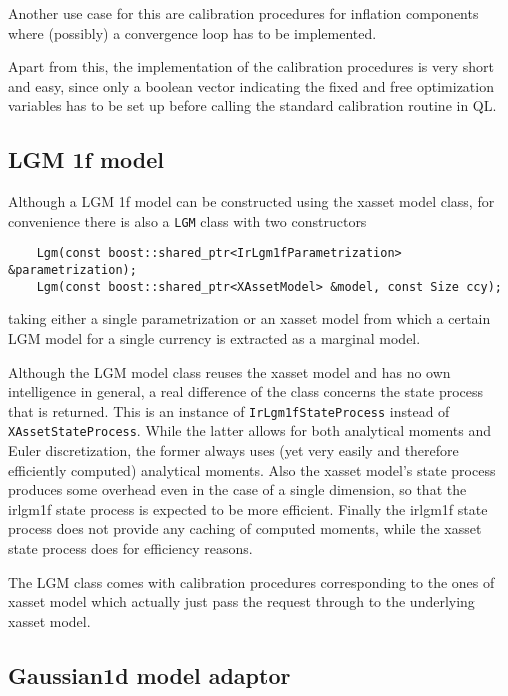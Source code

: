 \documentclass[12pt, a4paper]{article}
\begin{document}
Another use case for this are calibration procedures for inflation components where (possibly) a convergence loop has to be implemented.

Apart from this, the implementation of the calibration procedures is very short and easy, since only a boolean vector indicating the fixed and free optimization variables has to be set up before calling the standard calibration routine in QL.

\subsection{LGM 1f model}

Although a LGM 1f model can be constructed using the xasset model class, for convenience there is also a \verb+LGM+ class with two constructors

\medskip
\scriptsize
\begin{verbatim}
    Lgm(const boost::shared_ptr<IrLgm1fParametrization> &parametrization);
    Lgm(const boost::shared_ptr<XAssetModel> &model, const Size ccy);
\end{verbatim}
\normalsize
\medskip

taking either a single parametrization or an xasset model from which a certain LGM model for a single currency is extracted as a marginal model.

Although the LGM model class reuses the xasset model and has no own intelligence in general, a real difference of the class concerns the state process that is returned. This is an instance of \verb+IrLgm1fStateProcess+ instead of \verb+XAssetStateProcess+. While the latter allows for both analytical moments and Euler discretization, the former always uses (yet very easily and therefore efficiently computed) analytical moments. Also the xasset model's state process produces some overhead even in the case of a single dimension, so that the irlgm1f state process is expected to be more efficient. Finally the irlgm1f state process does not provide any caching of computed moments, while the xasset state process does for efficiency reasons.

The LGM class comes with calibration procedures corresponding to the ones of xasset model which actually just pass the request through to the underlying xasset model.

\subsection{Gaussian1d model adaptor}
\end{document}
